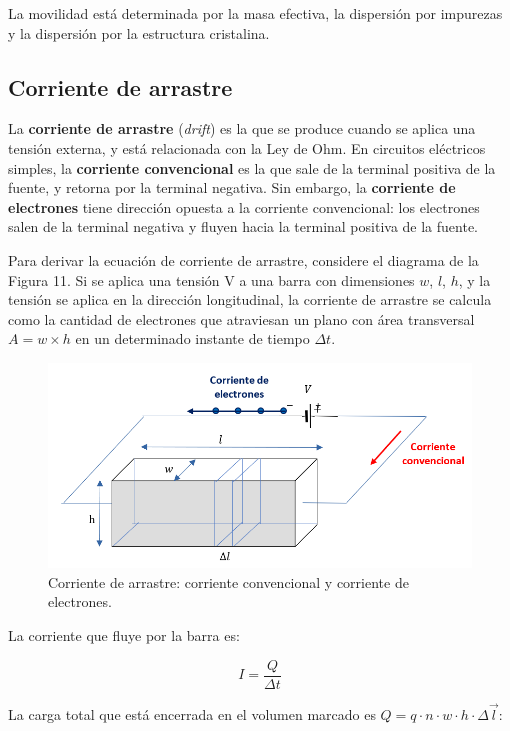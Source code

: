 La movilidad está determinada por la masa efectiva, la dispersión por impurezas y la dispersión por la estructura cristalina.

\subsection{Corriente de arrastre}

La \textbf{corriente de arrastre} (\textit{drift}) es la que se produce cuando se aplica una tensión externa, y está relacionada con la Ley de Ohm. En circuitos eléctricos simples, la \textbf{corriente convencional} es la que sale de la terminal positiva de la fuente, y retorna por la terminal negativa. Sin embargo, la \textbf{corriente de electrones} tiene dirección opuesta a la corriente convencional: los electrones salen de la terminal negativa y fluyen hacia la terminal positiva de la fuente.

Para derivar la ecuación de corriente de arrastre, considere el diagrama de la Figura 11. Si se aplica una tensión V a una barra con dimensiones $w$, $l$, $h$, y la tensión se aplica en la dirección longitudinal, la corriente de arrastre se calcula como la cantidad de electrones que atraviesan un plano con área transversal $A=w\times{}h$ en un determinado instante de tiempo $\Delta{}t$.

\begin{figure}[H]
    \centering
    \includegraphics{figuras/corriente_arrastre.png}
    \caption{Corriente de arrastre: corriente convencional y corriente de electrones.}
    \label{corriente_arrastre}
\end{figure}

La corriente que fluye por la barra es:

\[ I = \dfrac{Q}{\Delta{}t} \]

La carga total que está encerrada en el volumen marcado es $Q=q \cdot n \cdot w \cdot h \cdot \Delta \vec{l}$:


